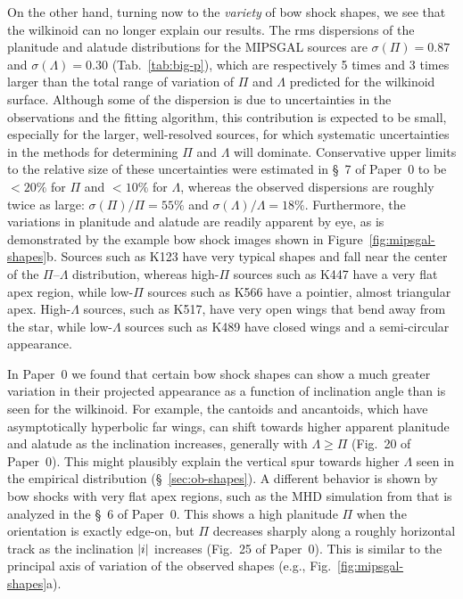 On the other hand, turning now to the \emph{variety} of bow shock
shapes, we see that the wilkinoid can no longer explain our results.
The rms dispersions of the planitude and alatude distributions for the
MIPSGAL sources are \(\sigma(\Pi) = 0.87\) and
\(\sigma(\Lambda) = 0.30\) (Tab.~\ref{tab:big-p}), which are respectively 5 times
and 3 times larger than the total range of variation of \(\Pi\) and
\(\Lambda\) predicted for the wilkinoid surface.  Although some of the
dispersion is due to uncertainties in the observations and the fitting
algorithm, this contribution is expected to be small, especially for
the larger, well-resolved sources, for which systematic uncertainties
in the methods for determining \(\Pi\) and \(\Lambda\) will
dominate. Conservative upper limits to the relative size of these
uncertainties were estimated in \S~7 of Paper~0 to be \(< 20\%\) for
\(\Pi\) and \(< 10\%\) for \(\Lambda\), whereas the observed dispersions are
roughly twice as large: \(\sigma(\Pi)/\Pi = 55\%\) and
\(\sigma(\Lambda)/\Lambda = 18\%\).  Furthermore, the variations in planitude and
alatude are readily apparent by eye, as is demonstrated by the example
bow shock images shown in Figure~\ref{fig:mipsgal-shapes}b.  Sources
such as K123 have very typical shapes and fall near the center of the
\(\Pi\)--\(\Lambda\) distribution, whereas high-\(\Pi\) sources such as K447 have
a very flat apex region, while low-\(\Pi\) sources such as K566 have a
pointier, almost triangular apex.  High-\(\Lambda\) sources, such as K517,
have very open wings that bend away from the star, while
low-\(\Lambda\) sources such as K489 have closed wings and a semi-circular
appearance.


In Paper~0 we found that certain bow shock shapes can show a much
greater variation in their projected appearance as a function of
inclination angle than is seen for the wilkinoid.  For example, the
cantoids and ancantoids, which have asymptotically hyperbolic far
wings, can shift towards higher apparent planitude and alatude as the
inclination increases, generally with \(\Lambda \ge \Pi\) (Fig.~20 of Paper~0).
This might plausibly explain the vertical spur towards higher
\(\Lambda\) seen in the empirical distribution (\S~\ref{sec:ob-shapes}). A
different behavior is shown by bow shocks with very flat apex regions,
such as the MHD simulation from \citet{Meyer:2017a} that is analyzed
in the \S~6 of Paper~0.  This shows a high planitude \(\Pi\) when the
orientation is exactly edge-on, but \(\Pi\) decreases sharply along a
roughly horizontal track as the inclination \(\lvert i\rvert\) increases
(Fig.~25 of Paper~0).  This is similar to the principal axis of
variation of the observed shapes (e.g.,
Fig.~\ref{fig:mipsgal-shapes}a).

